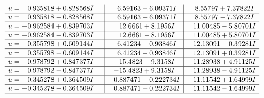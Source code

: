\documentclass[1p]{elsarticle_modified}
\theoremstyle{definition}
\begin{document}
$$\begin{array}{c|c|c}
\begin{aligned}
u &= \phantom{-}0.935818 + 0.828568 I\end{aligned}
 & \phantom{-}6.59163 - 6.09371 I & \phantom{-}8.55797 + 7.37822 I \\ \hline\begin{aligned}
u &= \phantom{-}0.935818 - 0.828568 I\end{aligned}
 & \phantom{-}6.59163 + 6.09371 I & \phantom{-}8.55797 - 7.37822 I \\ \hline\begin{aligned}
u &= -0.962584 + 0.839703 I\end{aligned}
 & \phantom{-}12.6661 + 8.1956 I & \phantom{-}11.00485 - 5.80701 I \\ \hline\begin{aligned}
u &= -0.962584 - 0.839703 I\end{aligned}
 & \phantom{-}12.6661 - 8.1956 I & \phantom{-}11.00485 + 5.80701 I \\ \hline\begin{aligned}
u &= \phantom{-}0.355798 + 0.609144 I\end{aligned}
 & \phantom{-}6.41234 + 0.93846 I & \phantom{-}12.13091 - 0.39281 I \\ \hline\begin{aligned}
u &= \phantom{-}0.355798 - 0.609144 I\end{aligned}
 & \phantom{-}6.41234 - 0.93846 I & \phantom{-}12.13091 + 0.39281 I \\ \hline\begin{aligned}
u &= \phantom{-}0.978792 + 0.847377 I\end{aligned}
 & -15.4823 - 9.3158 I & \phantom{-}11.28938 + 4.91125 I \\ \hline\begin{aligned}
u &= \phantom{-}0.978792 - 0.847377 I\end{aligned}
 & -15.4823 + 9.3158 I & \phantom{-}11.28938 - 4.91125 I \\ \hline\begin{aligned}
u &= -0.345278 + 0.364509 I\end{aligned}
 & \phantom{-}0.887471 - 0.222734 I & \phantom{-}11.11542 + 1.64999 I \\ \hline\begin{aligned}
u &= -0.345278 - 0.364509 I\end{aligned}
 & \phantom{-}0.887471 + 0.222734 I & \phantom{-}11.11542 - 1.64999 I\\
 \hline 
 \end{array}$$\newpage
\newpage\renewcommand{\arraystretch}{1}
\end{document}
